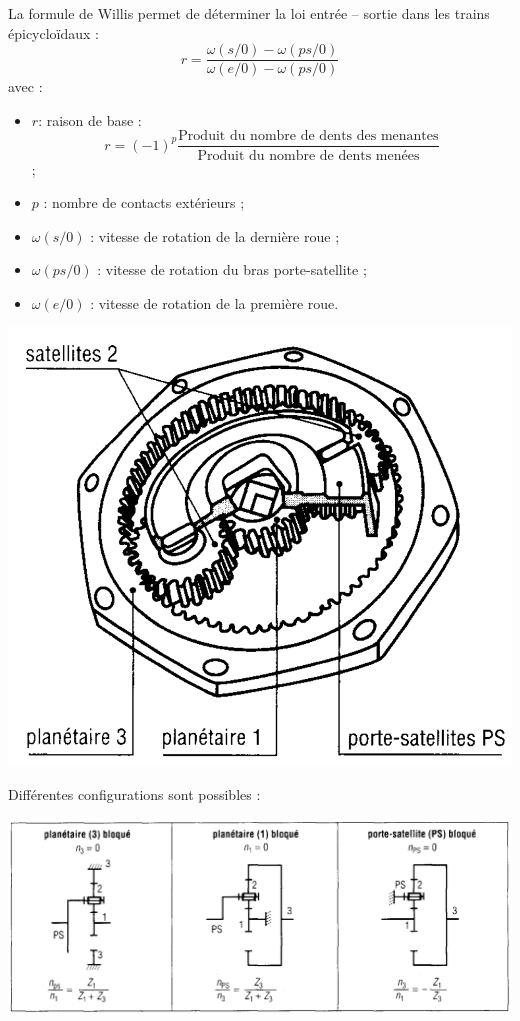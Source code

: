 \documentclass[11pt,oneside]{article}
\begin{document}
\begin{minipage}[c]{.55\linewidth}
La formule de Willis permet de déterminer la loi entrée -- sortie dans les trains épicycloïdaux :
$$
r = \dfrac{\omega(s/0)-\omega(ps/0)}{\omega(e/0)-\omega(ps/0)}
$$
avec : 
\begin{itemize}
\item $r$: raison de base : 
$$r=(-1)^p \dfrac{\text{Produit du nombre de dents des menantes}}{\text{Produit du nombre de dents menées}}$$;
\item $p$ : nombre de contacts extérieurs ;
\item $\omega(s/0)$  : vitesse de rotation de la dernière roue ;
\item $\omega(ps/0)$  : vitesse de rotation du bras porte-satellite ;
\item $\omega(e/0)$  : vitesse de rotation de la première roue.
\end{itemize} 
\end{minipage} \hfill
\begin{minipage}[c]{.4\linewidth}
\begin{center}
\includegraphics[width=.8\textwidth]{png/fig_84}
\end{center}
\end{minipage} 

Différentes configurations sont possibles :


\begin{center}
\includegraphics[width=.8\textwidth]{png/fig_85}
\end{center}
\end{document}
